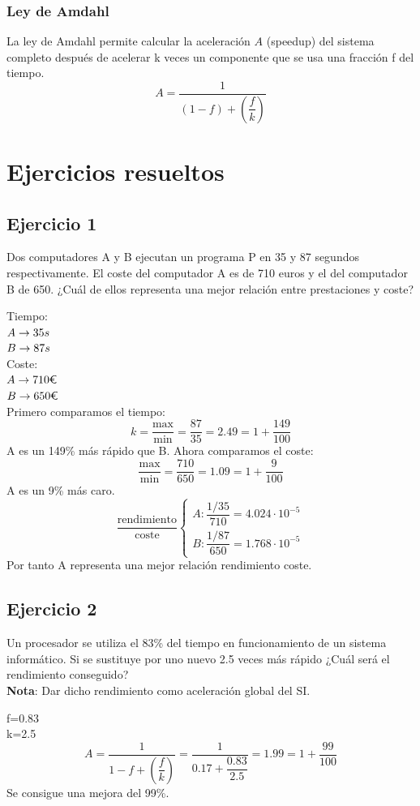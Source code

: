 \subsubsection{Ley de Amdahl}
La ley de Amdahl permite calcular la aceleración $A$ (speedup) del sistema completo después de acelerar k veces un componente que se usa una fracción f del tiempo.
\[
A=\dfrac{1}{(1-f)+(\dfrac{f}{k})}
\]

\newpage
\section{Ejercicios resueltos}
\subsection{Ejercicio 1}
\noindent
Dos computadores A y B ejecutan un programa P en 35 y 87 segundos respectivamente. El coste del computador A es de 710 euros y el del computador B de 650. ¿Cuál de ellos representa una mejor relación entre prestaciones y coste?
\begin{tcolorbox}[colback=white,colframe=cyan!50!black,fonttitle=\bfseries]


Tiempo:\\
$A\rightarrow 35s$\\
$B\rightarrow 87 s$\\
Coste:\\
$A\fd 710 \textup{\euro}$\\
$B\fd 650 \textup{\euro}$\\
Primero comparamos el tiempo:
\[
k=\dfrac{\text{max}}{\text{min}}=\dfrac{87}{35}=2.49=1+\dfrac{149}{100}
\]
A es un 149\% más rápido que B. Ahora comparamos el coste:
\[
\dfrac{\text{max}}{\text{min}}=\dfrac{710}{650}=1.09=1+\dfrac{9}{100}
\]
A es un 9\% más caro.
\[
\dfrac{\text{rendimiento}}{\text{coste}}\left\lbrace\begin{array}{ll}
A: \dfrac{1/35}{710}=4.024\cdot 10^{-5}\\
B: \dfrac{1/87}{650}=1.768\cdot 10^{-5}
\end{array}\right.
\]
Por tanto A representa una mejor relación rendimiento coste.
\end{tcolorbox}
\subsection{Ejercicio 2}
\noindent
Un procesador se utiliza el 83\% del tiempo en funcionamiento de un sistema informático. Si se sustituye por uno nuevo 2.5 veces más rápido ¿Cuál será el rendimiento conseguido?\\
\textbf{Nota}: Dar dicho rendimiento como aceleración global del SI.
\begin{tcolorbox}[colback=white,colframe=cyan!50!black,fonttitle=\bfseries]
f=0.83\\
k=2.5
\[
A=\dfrac{1}{1-f+\left(\dfrac{f}{k}\right)}=\dfrac{1}{0.17+\dfrac{0.83}{2.5}}=1.99=1+\dfrac{99}{100}
\]
Se consigue una mejora del 99\%.
\end{tcolorbox}
